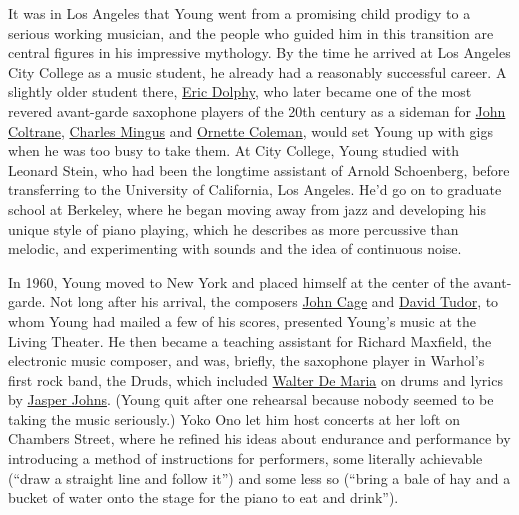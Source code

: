 It was in Los Angeles that Young went from a promising child prodigy to
a serious working musician, and the people who guided him in this
transition are central figures in his impressive mythology. By the time
he arrived at Los Angeles City College as a music student, he already
had a reasonably successful career. A slightly older student there,
\href{https://www.nytimes3xbfgragh.onion/2014/05/28/arts/music/a-new-focus-on-eric-dolphy-in-washington-and-montclair.html}{Eric
Dolphy}, who later became one of the most revered avant-garde saxophone
players of the 20th century as a sideman for
\href{https://www.nytimes3xbfgragh.onion/topic/person/john-coltrane}{John
Coltrane},
\href{https://www.nytimes3xbfgragh.onion/1979/01/09/archives/charles-mingus-56-bass-player-bandleader-and-composer-dead-an.html}{Charles
Mingus} and
\href{https://www.nytimes3xbfgragh.onion/2015/06/12/arts/music/ornette-coleman-jazz-saxophonist-dies-at-85-obituary.html}{Ornette
Coleman}, would set Young up with gigs when he was too busy to take
them. At City College, Young studied with Leonard Stein, who had been
the longtime assistant of Arnold Schoenberg, before transferring to the
University of California, Los Angeles. He'd go on to graduate school at
Berkeley, where he began moving away from jazz and developing his unique
style of piano playing, which he describes as more percussive than
melodic, and experimenting with sounds and the idea of continuous noise.

In 1960, Young moved to New York and placed himself at the center of the
avant-garde. Not long after his arrival, the composers
\href{https://www.nytimes3xbfgragh.onion/topic/person/john-cage}{John
Cage} and
\href{https://www.nytimes3xbfgragh.onion/1996/08/15/arts/david-tudor-70-electronic-composer-dies.html}{David
Tudor}, to whom Young had mailed a few of his scores, presented Young's
music at the Living Theater. He then became a teaching assistant for
Richard Maxfield, the electronic music composer, and was, briefly, the
saxophone player in Warhol's first rock band, the Druds, which included
\href{https://www.nytimes3xbfgragh.onion/2013/07/27/arts/design/walter-de-maria-artist-on-grand-scale-dies-at-77.html}{Walter
De Maria} on drums and lyrics by
\href{https://www.nytimes3xbfgragh.onion/2019/02/18/t-magazine/jasper-johns.html}{Jasper
Johns}. (Young quit after one rehearsal because nobody seemed to be
taking the music seriously.) Yoko Ono let him host concerts at her loft
on Chambers Street, where he refined his ideas about endurance and
performance by introducing a method of instructions for performers, some
literally achievable (``draw a straight line and follow it'') and some
less so (``bring a bale of hay and a bucket of water onto the stage for
the piano to eat and drink'').

